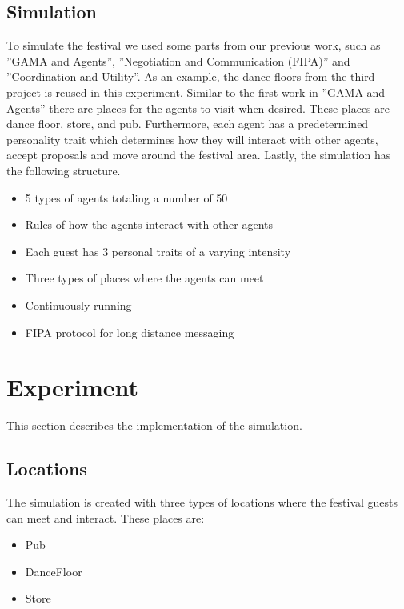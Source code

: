 \documentclass[a4paper,10pt]{article}
\begin{document}
\subsection{Simulation}
To simulate the festival we used some parts from our previous work, such as ”GAMA and Agents”, ”Negotiation and Communication 
(FIPA)” and ”Coordination and Utility”. As an example, the dance floors from the third project is reused in this experiment. 
Similar to the first work in ”GAMA and Agents” there are places for the agents to visit when desired. These places are dance 
floor, store,  and pub. Furthermore, each agent has a predetermined personality trait which determines how they will 
interact with other agents, accept proposals and move around the festival area. 
Lastly, the simulation has the following structure.

\begin{itemize}
    \item 5 types of agents totaling a number of 50 
    \item Rules of how the agents interact with other agents
    \item Each guest has 3 personal traits of a varying intensity
    \item Three types of places where the agents can meet
    \item Continuously running 
    \item FIPA protocol for long distance messaging
\end{itemize}

\section{Experiment}
This section describes the implementation of the simulation.

\maketitle
\subsection{Locations}
The simulation is created with three types of locations where the festival guests can meet and interact. These places are:

\begin{itemize}
    \item Pub
    \item DanceFloor
    \item Store
    
\end{itemize}
\end{document}
